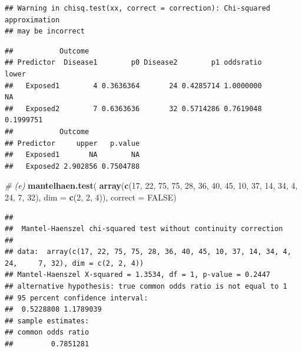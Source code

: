 \documentclass[]{article}
\newenvironment{Shaded}{\begin{snugshade}}{\end{snugshade}}
\newcommand{\KeywordTok}[1]{\textcolor[rgb]{0.13,0.29,0.53}{\textbf{#1}}}
\newcommand{\DataTypeTok}[1]{\textcolor[rgb]{0.13,0.29,0.53}{#1}}
\newcommand{\DecValTok}[1]{\textcolor[rgb]{0.00,0.00,0.81}{#1}}
\newcommand{\CommentTok}[1]{\textcolor[rgb]{0.56,0.35,0.01}{\textit{#1}}}
\newcommand{\OtherTok}[1]{\textcolor[rgb]{0.56,0.35,0.01}{#1}}
\newcommand{\OperatorTok}[1]{\textcolor[rgb]{0.81,0.36,0.00}{\textbf{#1}}}
\newcommand{\NormalTok}[1]{#1}
\begin{document}
\begin{Shaded}
\end{Shaded}

\begin{verbatim}
## Warning in chisq.test(xx, correct = correction): Chi-squared approximation
## may be incorrect
\end{verbatim}

\begin{verbatim}
##           Outcome
## Predictor  Disease1        p0 Disease2        p1 oddsratio     lower
##   Exposed1        4 0.3636364       24 0.4285714 1.0000000        NA
##   Exposed2        7 0.6363636       32 0.5714286 0.7619048 0.1999751
##           Outcome
## Predictor     upper   p.value
##   Exposed1       NA        NA
##   Exposed2 2.902856 0.7504788
\end{verbatim}

\begin{Shaded}
\begin{Highlighting}[]
\CommentTok{# (e)}
\KeywordTok{mantelhaen.test}\NormalTok{(}
\KeywordTok{array}\NormalTok{(}\KeywordTok{c}\NormalTok{(}\DecValTok{17}\NormalTok{, }\DecValTok{22}\NormalTok{, }\DecValTok{75}\NormalTok{, }\DecValTok{75}\NormalTok{,}
  \DecValTok{28}\NormalTok{, }\DecValTok{36}\NormalTok{, }\DecValTok{40}\NormalTok{, }\DecValTok{45}\NormalTok{,}
  \DecValTok{10}\NormalTok{, }\DecValTok{37}\NormalTok{, }\DecValTok{14}\NormalTok{, }\DecValTok{34}\NormalTok{,}
  \DecValTok{4}\NormalTok{, }\DecValTok{24}\NormalTok{, }\DecValTok{7}\NormalTok{, }\DecValTok{32}\NormalTok{), }\DataTypeTok{dim =} \KeywordTok{c}\NormalTok{(}\DecValTok{2}\NormalTok{, }\DecValTok{2}\NormalTok{, }\DecValTok{4}\NormalTok{)), }
  \DataTypeTok{correct =} \OtherTok{FALSE}\NormalTok{)}
\end{Highlighting}
\end{Shaded}

\begin{verbatim}
## 
##  Mantel-Haenszel chi-squared test without continuity correction
## 
## data:  array(c(17, 22, 75, 75, 28, 36, 40, 45, 10, 37, 14, 34, 4, 24,     7, 32), dim = c(2, 2, 4))
## Mantel-Haenszel X-squared = 1.3534, df = 1, p-value = 0.2447
## alternative hypothesis: true common odds ratio is not equal to 1
## 95 percent confidence interval:
##  0.5228808 1.1789039
## sample estimates:
## common odds ratio 
##         0.7851281
\end{verbatim}
\end{document}
